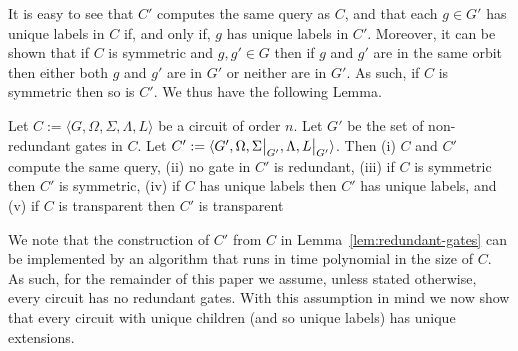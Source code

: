 \documentclass[../paper.tex]{subfiles}
\begin{document}
It is easy to see that $C'$ computes the same query as $C$, and that each $g \in
G'$ has unique labels in $C$ if, and only if, $g$ has unique labels in $C'$.
Moreover, it can be shown that if $C$ is symmetric and $g, g' \in G$ then if $g$
and $g'$ are in the same orbit then either both $g$ and $g'$ are in $G'$ or
neither are in $G'$. As such, if $C$ is symmetric then so is $C'$. We thus have
the following Lemma.

\begin{lem}
  \label{lem:redundant-gates}
  Let $C := \langle G, \Omega, \Sigma, \Lambda, L \rangle$ be a circuit of order
  $n$. Let $G'$ be the set of non-redundant gates in $C$. Let $C' := \langle G',
  \Omega, \restr{\Sigma}{G'}, \Lambda, \restr{L}{G'} \rangle$. Then (i) $C$ and
  $C'$ compute the same query, (ii) no gate in $C'$ is redundant, (iii) if $C$
  is symmetric then $C'$ is symmetric, (iv) if $C$ has unique labels then $C'$
  has unique labels, and (v) if $C$ is transparent then $C'$ is transparent
\end{lem}

We note that the construction of $C'$ from $C$ in
Lemma~\ref{lem:redundant-gates} can be implemented by an algorithm that runs in
time polynomial in the size of $C$. As such, for the remainder of this paper we
assume, unless stated otherwise, every circuit has no redundant gates. With this
assumption in mind we now show that every circuit with unique children (and so
unique labels) has unique extensions.

\end{document}
